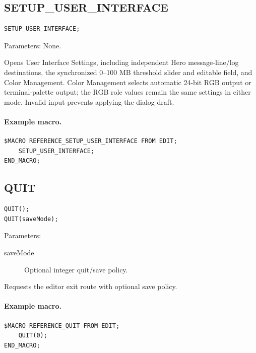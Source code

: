 \documentclass[a4paper,10pt,twoside,openany]{book}
\newenvironment{mrmacextension}{\begin{changebar}}{\end{changebar}}
\begin{document}
\begin{mrmacextension}
\label{prim:procedure-setup-user-interface}
\subsection*{SETUP\_USER\_INTERFACE}
\begin{verbatim}
SETUP_USER_INTERFACE;
\end{verbatim}
Parameters: None.

Opens User Interface Settings, including independent Hero message-line/log
destinations, the synchronized 0--100 MB threshold slider and editable field,
and Color Management. Color Management selects automatic 24-bit RGB output
or terminal-palette output; the RGB role values remain the same settings in
either mode. Invalid input prevents applying the dialog draft.

\paragraph{Example macro.}
\begin{verbatim}
$MACRO REFERENCE_SETUP_USER_INTERFACE FROM EDIT;
    SETUP_USER_INTERFACE;
END_MACRO;
\end{verbatim}
\end{mrmacextension}

\label{prim:procedure-quit}
\subsection*{QUIT}
\begin{verbatim}
QUIT();
QUIT(saveMode);
\end{verbatim}
Parameters:
\begin{description}
\item[saveMode] Optional integer quit/save policy.
\end{description}

Requests the editor exit route with optional save policy.

\paragraph{Example macro.}
\begin{verbatim}
$MACRO REFERENCE_QUIT FROM EDIT;
    QUIT(0);
END_MACRO;
\end{verbatim}
\end{document}
